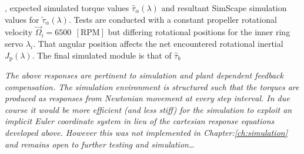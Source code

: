\par
, expected simulated torque values $\hat{\tau}_\alpha(\lambda)$ and resultant SimScape simulation values for $\tilde{\tau}_\alpha(\lambda)$. Tests are conducted with a constant propeller rotational velocity $\vec{\Omega}_i=6500~~[\text{RPM}]$ but differing rotational positions for the inner ring servo $\lambda_i$. That angular position affects the net encountered rotational inertial $J_\text{p}(\lambda)$.
The final simulated module is that of $\hat{\tau}_b$
\par
\emph{\color{Gray}The above responses are pertinent to simulation and plant dependent feedback compensation. The simulation environment is structured such that the torques are produced as responses from Newtonian movement at every step interval. In due course it would be more efficient (and less stiff) for the simulation to exploit an implicit Euler\cite{physicallybased,multibodydynamics} coordinate system in lieu of the cartesian response equations developed above. However this was not implemented in Chapter:\ref{ch:simulation} and remains open to further testing and simulation\ldots}
\par
\newpage
